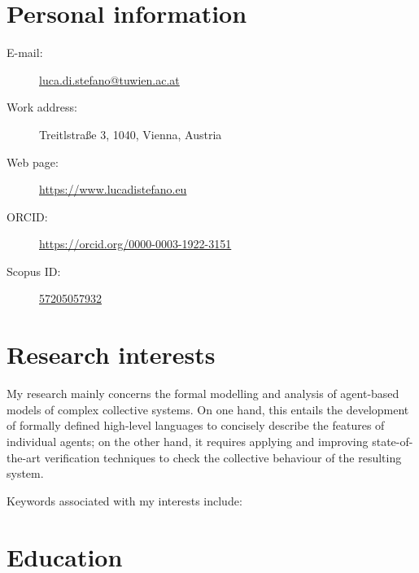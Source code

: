 \documentclass[11pt,a4paper]{moderncv}
\author{Luca Di Stefano}
\date{\today}
\begin{document}
\makeatletter
\bfseries
\noindent {\Large\@author}\vspace*{0.4em}

\normalfont
{}

\noindent{\monthyear\today}
\makeatother

\section*{Personal information}
\begin{description}
    \item[E-mail:] \href{mailto:luca.di.stefano@tuwien.ac.at}{luca.di.stefano@tuwien.ac.at} 
    \item[Work address:] Treitlstraße 3, 1040, Vienna, Austria
    \item[Web page:] \url{https://www.lucadistefano.eu}
    \item[ORCID:] \url{https://orcid.org/0000-0003-1922-3151}
    \item[Scopus ID:] \href{https://www.scopus.com/authid/detail.uri?authorId=57205057932}{57205057932}
\end{description}

\section{Research interests}
My research mainly concerns the formal modelling and analysis of agent-based
models of complex collective systems.
On one hand, this entails the development of formally
defined high-level languages to concisely describe the features of individual
agents; on the other hand, it requires applying and improving state-of-the-art
verification techniques to check the collective behaviour of the resulting system.

Keywords associated with my interests include:



\section*{Education}

\end{document}
